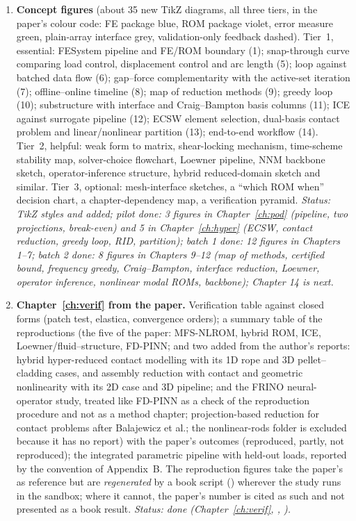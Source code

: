 \begin{enumerate}
\item \textbf{Concept figures} (about 35 new TikZ diagrams, all three tiers, in the paper's colour code: FE package blue, ROM package violet, error measure green, plain-array interface grey, validation-only feedback dashed). Tier~1, essential: FESystem pipeline and FE/ROM boundary (1); snap-through curve comparing load control, displacement control and arc length (5); loop against batched data flow (6); gap--force complementarity with the active-set iteration (7); offline--online timeline (8); map of reduction methods (9); greedy loop (10); substructure with interface and Craig--Bampton basis columns (11); ICE against surrogate pipeline (12); ECSW element selection, dual-basis contact problem and linear/nonlinear partition (13); end-to-end workflow (14). Tier~2, helpful: weak form to matrix, shear-locking mechanism, time-scheme stability map, solver-choice flowchart, Loewner pipeline, NNM backbone sketch, operator-inference structure, hybrid reduced-domain sketch and similar. Tier~3, optional: mesh-interface sketches, a ``which ROM when'' decision chart, a chapter-dependency map, a verification pyramid. \emph{Status: TikZ styles and  added; pilot done: 3 figures in Chapter~\ref{ch:pod} (pipeline, two projections, break-even) and 5 in Chapter~\ref{ch:hyper} (ECSW, contact reduction, greedy loop, RID, partition); batch 1 done: 12 figures in Chapters 1--7; batch 2 done: 8 figures in Chapters 9--12 (map of methods, certified bound, frequency greedy, Craig--Bampton, interface reduction, Loewner, operator inference, nonlinear modal ROMs, backbone); Chapter 14 is next.}
\item \textbf{Chapter~\ref{ch:verif} from the paper.} Verification table against closed forms (patch test, elastica, convergence orders); a summary table of the reproductions (the five of the paper: MFS-NLROM, hybrid ROM, ICE, Loewner/fluid--structure, FD-PINN; and two added from the author's reports: hybrid hyper-reduced contact modelling with its 1D rope and 3D pellet--cladding cases, and assembly reduction with contact and geometric nonlinearity with its 2D case and 3D pipeline; and the FRINO neural-operator study, treated like FD-PINN as a check of the reproduction procedure and not as a method chapter; projection-based reduction for contact problems after Balajewicz et al.; the nonlinear-rods folder is excluded because it has no report) with the paper's outcomes (reproduced, partly, not reproduced); the integrated parametric pipeline with held-out loads, reported by the convention of Appendix~B. The reproduction figures take the paper's as reference but are \emph{regenerated} by a book script () wherever the study runs in the sandbox; where it cannot, the paper's number is cited as such and not presented as a book result. \emph{Status: done (Chapter~\ref{ch:verif}, , ).}

\end{enumerate}
